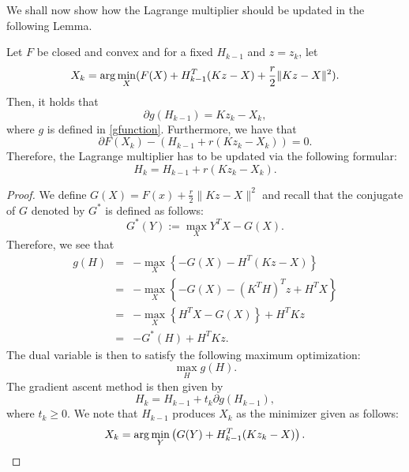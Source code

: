 \begin{itemize}
\begin{equation}
\end{equation}
We shall now show how the Lagrange multiplier should be updated in the following Lemma. 
\begin{lemma}
Let $F$ be closed and convex and for a fixed $H_{k-1}$ and $z = z_k$, let 
\begin{equation} 
X_k = {\rm arg}\min_{X} ( F(X) + H_{k-1}^T (Kz - X) + \frac{r}{2} \|Kz - X\|^2).  
\end{equation} 
Then, it holds that 
\begin{equation} 
\partial g(H_{k-1}) = Kz_k - X_k,  
\end{equation}
where $g$ is defined in \eqref{gfunction}. 
Furthermore, we have that
\begin{equation} 
\partial F(X_k) - (H_{k-1} + r (K z_k - X_k)) = 0. 
\end{equation} 
Therefore, the Lagrange multiplier has to be updated via the following formular: 
\begin{equation}
H_k = H_{k-1} + r (Kz_k - X_k). 
\end{equation}
\end{lemma}
\begin{proof} 
We define $G(X) = F(x) + \frac{r}{2} \|Kz - X\|^2$ and recall that the conjugate of $G$ denoted by $G^*$ is defined as follows: 
\begin{equation}
G^*(Y) := \max_{X} Y^T X - G(X). 
\end{equation}
Therefore, we see that 
\begin{eqnarray*} 
g(H) &=& -\max_X \left \{ -G(X) - H^T (Kz - X)  \right \} \\ 
&=&  -\max_X \left \{ -G(X) - (K^T H)^T z + H^TX \right \} \\
&=&  - \max_X \left \{ H^T X - G(X) \right \} + H^T K z \\
&=& - G^*(H) + H^TKz. 
\end{eqnarray*} 
The dual variable is then to satisfy the following maximum optimization: 
\begin{equation} 
\max_H g(H). 
\end{equation} 
The gradient ascent method is then given by 
\begin{equation} 
H_k = H_{k-1} + t_k \partial g(H_{k-1}), 
\end{equation} 
where $t_k \geq 0$. We note that $H_{k-1}$ produces $X_k$ as the minimizer given as follows: 
\begin{equation} 
X_k = {\rm arg}\min_Y \left ( G(Y) + H_{k-1}^T (K z_k - X) \right ).  
\end{equation} 

\end{proof}
\end{itemize}
